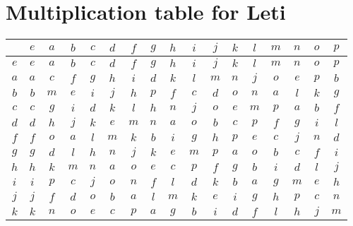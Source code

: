 \documentclass[12pt]{amsart}
\begin{document}
\thispagestyle{empty}

\section*{Multiplication table for Leti}

\begin{center}\begin{tabular}{c|cccccccccccccccc}
	&\(e\) &\(a\) &\(b\) &\(c\) &\(d\) &\(f\) &\(g\) &\(h\) &\(i\) &\(j\) &\(k\) &\(l\) &\(m\) &\(n\) &\(o\) &\(p\) \\\hline
	\(e\)  & \(e\)  & \(a\)  & \(b\)  & \(c\)  & \(d\)  & \(f\)  & \(g\)  & \(h\)  & \(i\)  & \(j\)  & \(k\)  & \(l\)  & \(m\)  & \(n\)  & \(o\)  & \(p\)  \\
	\(a\)  & \(a\)  & \(c\)  & \(f\)  & \(g\)  & \(h\)  & \(i\)  & \(d\)  & \(k\)  & \(l\)  & \(m\)  & \(n\)  & \(j\)  & \(o\)  & \(e\)  & \(p\)  & \(b\)  \\
	\(b\)  & \(b\)  & \(m\)  & \(e\)  & \(i\)  & \(j\)  & \(h\)  & \(p\)  & \(f\)  & \(c\)  & \(d\)  & \(o\)  & \(n\)  & \(a\)  & \(l\)  & \(k\)  & \(g\)  \\
	\(c\)  & \(c\)  & \(g\)  & \(i\)  & \(d\)  & \(k\)  & \(l\)  & \(h\)  & \(n\)  & \(j\)  & \(o\)  & \(e\)  & \(m\)  & \(p\)  & \(a\)  & \(b\)  & \(f\)  \\
	\(d\)  & \(d\)  & \(h\)  & \(j\)  & \(k\)  & \(e\)  & \(m\)  & \(n\)  & \(a\)  & \(o\)  & \(b\)  & \(c\)  & \(p\)  & \(f\)  & \(g\)  & \(i\)  & \(l\)  \\
	\(f\)  & \(f\)  & \(o\)  & \(a\)  & \(l\)  & \(m\)  & \(k\)  & \(b\)  & \(i\)  & \(g\)  & \(h\)  & \(p\)  & \(e\)  & \(c\)  & \(j\)  & \(n\)  & \(d\)  \\
	\(g\)  & \(g\)  & \(d\)  & \(l\)  & \(h\)  & \(n\)  & \(j\)  & \(k\)  & \(e\)  & \(m\)  & \(p\)  & \(a\)  & \(o\)  & \(b\)  & \(c\)  & \(f\)  & \(i\)  \\
	\(h\)  & \(h\)  & \(k\)  & \(m\)  & \(n\)  & \(a\)  & \(o\)  & \(e\)  & \(c\)  & \(p\)  & \(f\)  & \(g\)  & \(b\)  & \(i\)  & \(d\)  & \(l\)  & \(j\)  \\
	\(i\)  & \(i\)  & \(p\)  & \(c\)  & \(j\)  & \(o\)  & \(n\)  & \(f\)  & \(l\)  & \(d\)  & \(k\)  & \(b\)  & \(a\)  & \(g\)  & \(m\)  & \(e\)  & \(h\)  \\
	\(j\)  & \(j\)  & \(f\)  & \(d\)  & \(o\)  & \(b\)  & \(a\)  & \(l\)  & \(m\)  & \(k\)  & \(e\)  & \(i\)  & \(g\)  & \(h\)  & \(p\)  & \(c\)  & \(n\)  \\
	\(k\)  & \(k\)  & \(n\)  & \(o\)  & \(e\)  & \(c\)  & \(p\)  & \(a\)  & \(g\)  & \(b\)  & \(i\)  & \(d\)  & \(f\)  & \(l\)  & \(h\)  & \(j\)  & \(m\)  \\

\end{tabular}
\end{center}
\end{document}
